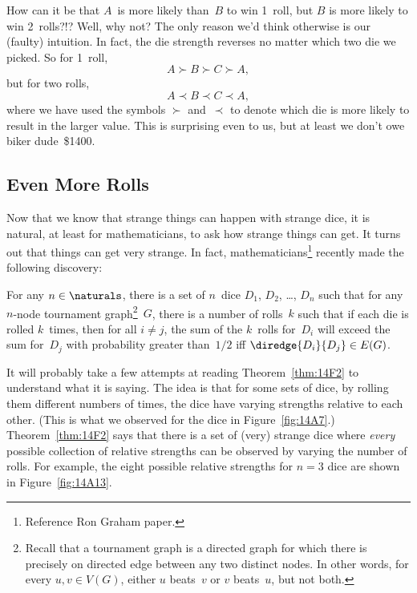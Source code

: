 How can it be that $A$~is more likely than~$B$ to win 1~roll, but $B$
is more likely to win 2~rolls?!?  Well, why not?  The only reason we'd
think otherwise is our (faulty) intuition.  In fact, the die strength
reverses no matter which two die we picked.  So for 1~roll,
\begin{equation*}
    A \succ B \succ C \succ A,
\end{equation*}
but for two rolls,
\begin{equation*}
    A \prec B \prec C \prec A,
\end{equation*}
where we have used the symbols $\succ$ and~$\prec$ to denote which die
is more likely to result in the larger value.  This is surprising even
to us, but at least we don't owe biker dude~\$1400.

\subsection{Even More Rolls}

Now that we know that strange things can happen with strange dice, it
is natural, at least for mathematicians, to ask how strange things can
get.  It turns out that things can get very strange.  In fact,
mathematicians\footnote{Reference Ron Graham paper.} recently made the
following discovery:

\begin{theorem}\label{thm:14F2}
For any $n \in \naturals$, there is a set of $n$~dice $D_1$, $D_2$,
\dots, $D_n$ such that for any $n$-node tournament
graph\footnote{Recall that a tournament graph is a directed graph for
  which there is precisely on directed edge between any two distinct
  nodes.  In other words, for every $u, v \in V(G)$, either $u$
  beats~$v$ or $v$ beats~$u$, but not both.}~$G$, there is a number of
rolls~$k$ such that if each die is rolled $k$~times, then for all $i
\ne j$, the sum of the $k$~rolls for~$D_i$ will exceed the sum
for~$D_j$ with probability greater than~$1/2$ iff $\diredge{D_i}{D_j}
\in E(G)$.
\end{theorem}

It will probably take a few attempts at reading Theorem~\ref{thm:14F2}
to understand what it is saying. The idea is that for some sets of
dice, by rolling them different numbers of times, the dice have
varying strengths relative to each other.  (This is what we observed
for the dice in Figure~\ref{fig:14A7}.)  Theorem~\ref{thm:14F2} says
that there is a set of (very) strange dice where \emph{every} possible
collection of relative strengths can be observed by varying the number
of rolls.  For example, the eight possible relative strengths for $n =
3$ dice are shown in Figure~\ref{fig:14A13}.  

